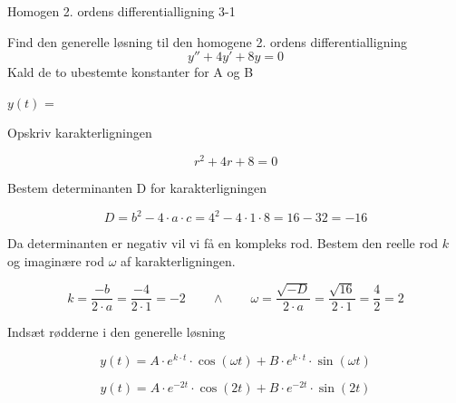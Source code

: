 \documentclass{article}
\begin{document}
\begin{exercise}{Homogen 2. ordens differentialligning 3-1}

Find den generelle løsning til den homogene 2. ordens differentialligning
\[
y'' + 4y' + 8y = 0
\]
Kald de to ubestemte konstanter for A og B

$y(t)$ = 


\hint

Opskriv karakterligningen

\hint

\[
r^2+ 4r + 8 = 0
\]


\hint

Bestem determinanten D for karakterligningen


\hint
\[
D = b^2 - 4 \cdot a \cdot c = 4^2 - 4 \cdot 1 \cdot 8 = 16 - 32 = -16
\]

\hint
Da determinanten er negativ vil vi få en kompleks rod. Bestem den reelle rod $k$ og imaginære rod $\omega$ af karakterligningen.


\hint

\[
k = \frac{-b}{2 \cdot a} = \frac{-4}{2 \cdot 1} = -2 \qquad \wedge \qquad \omega = \frac{\sqrt{-D}}{2 \cdot a} = \frac{\sqrt{16}}{2 \cdot 1} = \frac{4}{2} = 2
\]

\hint

Indsæt rødderne i den generelle løsning

\hint
\[
y(t) = A \cdot e^{k \cdot t} \cdot \cos(\omega t)+ B \cdot e^{k \cdot t} \cdot \sin(\omega t)
\]

\hint

\[
y(t) = A \cdot e^{-2 t} \cdot \cos(2 t)+ B \cdot e^{-2 t} \cdot \sin(2 t)
\]

\end{exercise}

\newpage
\end{document}
